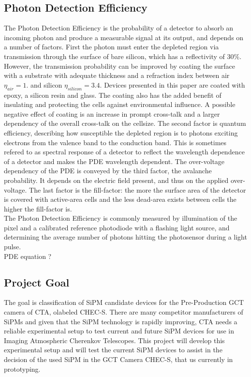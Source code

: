 \documentclass[12pt,article,type=msc,colorback,accentcolor=tud9c]{tudthesis}
\begin{document}
\subsection{Photon Detection Efficiency}
The Photon Detection Efficiency is the probability of a detector to absorb an incoming photon and produce a measurable signal at its output, and depends on a number of factors. First the photon must enter the depleted region via transmission through the surface of bare silicon, which has a reflectivity of 30$\%$. However, the transmission probability can be improved by coating the surface with a substrate with adequate thickness and a refraction index between air$\eta_{air} = 1.$ and silicon $\eta_{silicon} = 3.4$. Devices presented in this paper are coated with epoxy, a silicon resin and glass. The coating also has the added benefit of insulating and protecting the cells against environmental influence. A possible negative effect of coating is an increase in prompt cross-talk and a larger dependency of the overall cross-talk on the cellsize. The second factor is quantum efficiency, describing how susceptible the depleted region is to photons exciting electrons from the valence band to the conduction band. This is sometimes refered to as spectral response of a detector to reflect the wavelength dependence of a detector and makes the PDE wavelength dependent. The over-voltage dependency of the PDE is conveyed by the third factor, the avalanche probability. It depends on the electric field present, and thus on the applied over-voltage. The last factor is the fill-factor: the more the surface area of the detector is covered with active-area cells and the less dead-area exists between cells the higher the fill-factor is. \\
The Photon Detection Efficiency is commonly measured by illumination of the pixel and a calibrated reference photodiode with a flashing light source, and determining the average number of photons hitting the photosensor during a light pulse.
\\
PDE equation ?
\\






\newpage
\subsection{Project Goal}
The goal is classification of SiPM candidate devices for the Pre-Production GCT camera of CTA, olabeled CHEC-S. There are many competitor manufacturers of SiPMs and given that the SiPM technology is rapidly improving, CTA needs a reliable experimental setup to test current and future SiPM devices for use in Imaging Atmospheric Cherenkov Telescopes. This project will develop this experimental setup and will test the current SiPM devices to assist in the decision of the used SiPM in the GCT Camera CHEC-S, that us currently in prototyping.
\end{document}
